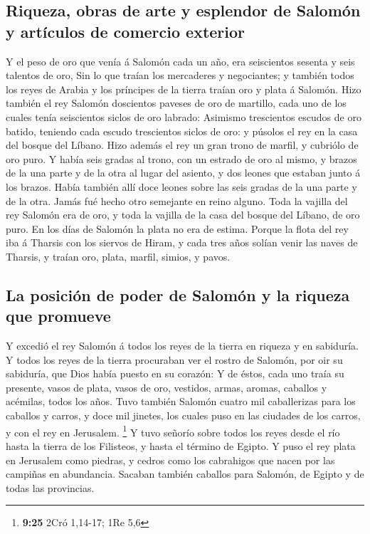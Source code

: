 \hypertarget{riqueza-obras-de-arte-y-esplendor-de-salomuxf3n-y-artuxedculos-de-comercio-exterior}{%
\subsection{Riqueza, obras de arte y esplendor de Salomón y artículos de
comercio
exterior}\label{riqueza-obras-de-arte-y-esplendor-de-salomuxf3n-y-artuxedculos-de-comercio-exterior}}

 Y el peso de oro que venía á Salomón cada un año, era
seiscientos sesenta y seis talentos de oro,  Sin lo que
traían los mercaderes y negociantes; y también todos los reyes de Arabia
y los príncipes de la tierra traían oro y plata á Salomón.
 Hizo también el rey Salomón doscientos paveses de oro de
martillo, cada uno de los cuales tenía seiscientos siclos de oro
labrado:  Asimismo trescientos escudos de oro batido,
teniendo cada escudo trescientos siclos de oro: y púsolos el rey en la
casa del bosque del Líbano.  Hizo además el rey un gran
trono de marfil, y cubriólo de oro puro.  Y había seis
gradas al trono, con un estrado de oro al mismo, y brazos de la una
parte y de la otra al lugar del asiento, y dos leones que estaban junto
á los brazos.  Había también allí doce leones sobre las
seis gradas de la una parte y de la otra. Jamás fué hecho otro semejante
en reino alguno.  Toda la vajilla del rey Salomón era de
oro, y toda la vajilla de la casa del bosque del Líbano, de oro puro. En
los días de Salomón la plata no era de estima.  Porque la
flota del rey iba á Tharsis con los siervos de Hiram, y cada tres años
solían venir las naves de Tharsis, y traían oro, plata, marfil, simios,
y pavos.

\hypertarget{la-posiciuxf3n-de-poder-de-salomuxf3n-y-la-riqueza-que-promueve}{%
\subsection{La posición de poder de Salomón y la riqueza que
promueve}\label{la-posiciuxf3n-de-poder-de-salomuxf3n-y-la-riqueza-que-promueve}}

 Y excedió el rey Salomón á todos los reyes de la tierra
en riqueza y en sabiduría.  Y todos los reyes de la
tierra procuraban ver el rostro de Salomón, por oir su sabiduría, que
Dios había puesto en su corazón:  Y de éstos, cada uno
traía su presente, vasos de plata, vasos de oro, vestidos, armas,
aromas, caballos y acémilas, todos los años.  Tuvo
también Salomón cuatro mil caballerizas para los caballos y carros, y
doce mil jinetes, los cuales puso en las ciudades de los carros, y con
el rey en Jerusalem. \footnote{\textbf{9:25} 2Cró 1,14-17; 1Re 5,6}
 Y tuvo señorío sobre todos los reyes desde el río hasta
la tierra de los Filisteos, y hasta el término de Egipto.
 Y puso el rey plata en Jerusalem como piedras, y cedros
como los cabrahigos que nacen por las campiñas en abundancia.
 Sacaban también caballos para Salomón, de Egipto y de
todas las provincias.

